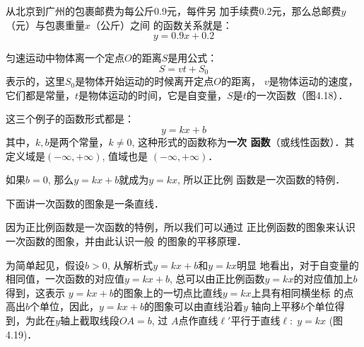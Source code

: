 \begin{example}
    从北京到广州的包裹邮费为每公斤0.9元，每件另
加手续费0.2元，那么总邮费$y$（元）与包裹重量$x$（公斤）之间
的函数关系就是：
\begin{equation}
  y=0.9x+0.2  
\end{equation}
\end{example}


\begin{example}
    匀速运动中物体离一个定点$O$的距离$S$是用公式：
\[S=vt+S_0\]
表示的，这里$S_0$是物体开始运动的时候离开定点$O$的距离，
$v$是物体运动的速度，它们都是常量，$t$是物体运动的时间，它是自变量，$S$是$t$的一次函数（图4.18）．
\begin{figure}[htp]
    \begin{center}
    \end{center}
    \caption{}
\end{figure}
\end{example}

这三个例子的函数形式都是：
\[y=kx+b\]
其中，$k,b$是两个常量，$k\ne 0$, 这种形式的函数称为\textbf{一次
函数}（或线性函数）．其定义域是$(-\infty,+\infty)$, 值域也是
$(-\infty,+\infty)$．

如果$b=0$, 那么$y=kx+b$就成为$y=kx$, 所以正比例
函数是一次函数的特例．

下面讲一次函数的图象是一条直线．

因为正比例函数是一次函数的特例，所以我们可以通过
正比例函数的图象来认识一次函数的图象，并由此认识一般
的图象的平移原理．

为简单起见，假设$b>0$, 从解析式$y=kx+b$和$y=kx$明显
地看出，对于自变量的相同值，一次函数的对应值$y=kx+b$,
总可以由正比例函数$y=kx$的对应值加上$b$得到，这表示
$y=kx+b$的图象上的一切点比直线$y=kx$上具有相同横坐标
的点高出$b$个单位，因此，$y=kx+b$的图象可以由直线沿着$y$
轴向上平移$b$个单位得到，为此在$y$轴上截取线段$OA=b$, 过
$A$点作直线$\ell'$平行于直线$\ell:\; y=kx$ (图4.19)．

